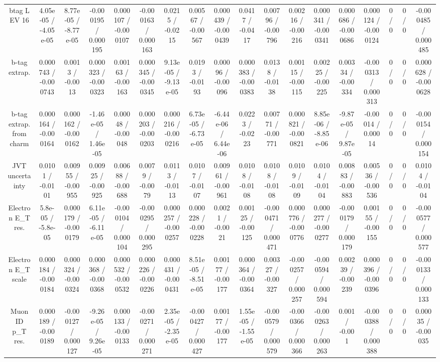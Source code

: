 \documentclass[10pt]{article}
\begin{document}
\begin{table}[htbp]
\begin{center}
\begin{tabular}{|c|c|c|c|c|c|c|c|c|c|c|c|c|c|c|c|c|c|}
  btag L EV 16 & 4.05e-05 / -4.05e-05 & 8.77e-05 / -8.77e-05 & -0.000195 / 0.000195 & 0.000107 / -0.000107 & -0.000163 / 0.000163 & 0.0215 / -0.0215 & 0.00567 / -0.00567 & 0.000439 / -0.000439 & 0.0417 / -0.0417 & 0.00796 / -0.00796 & 0.00216 / -0.00216 & 0.000341 / -0.000341 & 0.000686 / -0.000686 & 0.000124 / -0.000124 & 0 / 0 & 0 / 0 & -0.000485 / 0.000485 \\ 
  b-tag extrap. & 0.000743 / -0.000743 & 0.0013 / -0.0013 & 0.000323 / -0.000323 & 0.00163 / -0.00163 & 0.000345 / -0.000345 & 9.13e-05 / -9.13e-05 & 0.0193 / -0.0193 & 0.00096 / -0.00096 & 0.000383 / -0.000383 & 0.0138 / -0.0138 & 0.00115 / -0.00115 & 0.00225 / -0.00225 & 0.00334 / -0.00334 & -0.000313 / 0.000313 & 0 / 0 & 0 / 0 & 0.000628 / -0.000628 \\ 
  b-tag extrap. from charm & 0.000164 / -0.000164 & 0.000162 / -0.000162 & -1.46e-05 / 1.46e-05 & 0.00048 / -0.00048 & 0.000203 / -0.000203 & 0.000216 / -0.000216 & 6.73e-05 / -6.73e-05 & -6.44e-06 / 6.44e-06 & 0.0223 / -0.0223 & 0.00771 / -0.00771 & 0.000821 / -0.000821 & 8.85e-06 / -8.85e-06 & -9.87e-05 / 9.87e-05 & -0.00014 / 0.00014 & 0 / 0 & 0 / 0 & -0.000154 / 0.000154 \\ 
  JVT uncertainty & 0.0101 / -0.0101 & 0.00955 / -0.00955 & 0.00925 / -0.00925 & 0.00688 / -0.00688 & 0.0079 / -0.0079 & 0.0113 / -0.0113 & 0.0107 / -0.0107 & 0.00961 / -0.00961 & 0.0108 / -0.0108 & 0.0108 / -0.0108 & 0.0109 / -0.0109 & 0.0104 / -0.0104 & 0.00883 / -0.00883 & 0.00536 / -0.00536 & 0 / 0 & 0 / 0 & 0.0104 / -0.0104 \\ 
  Electron E_{T} res. & 5.8e-05 / -5.8e-05 & 0.000179 / -0.000179 & 6.11e-05 / -6.11e-05 & -0.000104 / 0.000104 & -0.000295 / 0.000295 & 0.000257 / -0.000257 & 0.000228 / -0.000228 & 0.0021 / -0.0021 & 0.00125 / -0.00125 & -0.000471 / 0.000471 & 0.000776 / -0.000776 & 0.000277 / -0.000277 & -0.000179 / 0.000179 & 0.00155 / -0.00155 & 0 / 0 & 0 / 0 & -0.000577 / 0.000577 \\ 
  Electron E_{T} scale & 0.000184 / -0.000184 & 0.000324 / -0.000324 & 0.000368 / -0.000368 & 0.000532 / -0.000532 & 0.000226 / -0.000226 & 0.000431 / -0.000431 & 8.51e-05 / -8.51e-05 & 0.00177 / -0.00177 & 0.000364 / -0.000364 & 0.00327 / -0.00327 & -0.000257 / 0.000257 & -0.000594 / 0.000594 & 0.00239 / -0.00239 & 0.000396 / -0.000396 & 0 / 0 & 0 / 0 & -0.000133 / 0.000133 \\ 
  Muon ID p_{T} res. & 0.000189 / -0.000189 & -0.000127 / 0.000127 & -9.26e-05 / 9.26e-05 & 0.000133 / -0.000133 & -0.000271 / 0.000271 & 2.35e-05 / -2.35e-05 & -0.000427 / 0.000427 & 0.00177 / -0.00177 & 1.55e-05 / -1.55e-05 & -0.000579 / 0.000579 & -0.000366 / 0.000366 & -0.000263 / 0.000263 & 0.001 / -0.001 & -0.000388 / 0.000388 & 0 / 0 & 0 / 0 & 0.00035 / -0.00035 \\ 

\end{tabular}
\end{center}
\end{table}
\end{document}
